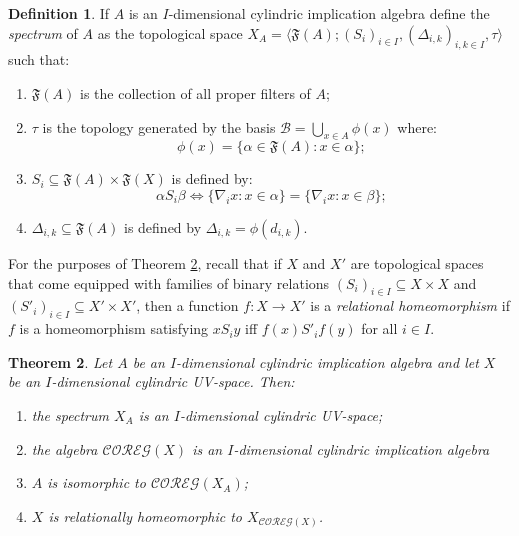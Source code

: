 \documentclass[reqno]{amsart}
\theoremstyle{plain}
\newtheorem{theorem}{Theorem}[section]
\theoremstyle{definition}
\newtheorem{definition}[theorem]{Definition}
\begin{document}
\begin{definition}\label{spectrum}
    If $A$ is an $I$-dimensional cylindric implication algebra define the \emph{spectrum} of $A$ as the topological space $X_A=\langle\mathfrak{F}(A);(S_i)_{i\in I},(\Delta_{i,k})_{i,k\in I},\tau\rangle$ such that: 
    \begin{enumerate}
        \item $\mathfrak{F}(A)$ is the collection of all proper filters of $A$; 
        \item $\tau$ is the topology generated by the basis $\mathcal{B}=\bigcup_{x\in A}\phi(x)$ where: \[\phi(x)=\{\alpha\in\mathfrak{F}(A):x\in \alpha\};\]  
        \item $S_i\subseteq\mathfrak{F}(A)\times\mathfrak{F}(X)$ is defined by: \[\alpha S_i\beta\Longleftrightarrow\{\nabla_ix:x\in\alpha\}=\{\nabla_ix:x\in\beta\};\] 
        \item $\Delta_{i,k}\subseteq\mathfrak{F}(A)$ is defined by $\Delta_{i,k}=\phi(d_{i,k})$. 
    \end{enumerate}
\end{definition}
For the purposes of Theorem \ref{rep theorem}, recall that if $X$ and $X'$ are topological spaces that come equipped with families of binary relations $(S_i)_{i\in I}\subseteq X\times X$ and $(S'_i)_{i\in I}\subseteq X'\times X'$, then a function $f\colon X\to X'$ is a \emph{relational homeomorphism} if $f$ is a homeomorphism satisfying $xS_iy$ iff  $f(x)S'_if(y)$ for all $i\in I$. 
\begin{theorem}\label{rep theorem}
    Let $A$ be an $I$-dimensional cylindric implication algebra and let $X$ be an $I$-dimensional cylindric UV-space. Then:
    \begin{enumerate}
    \item the spectrum $X_A$ is an $I$-dimensional cylindric UV-space; 
    \item the algebra $\mathcal{COREG}(X)$ is an $I$-dimensional cylindric implication algebra
        \item $A$ is isomorphic to $\mathcal{COREG}(X_A)$; 
        \item $X$ is relationally homeomorphic to $X_{\mathcal{COREG}(X)}$. 
    \end{enumerate}
\end{theorem}
\end{document}

